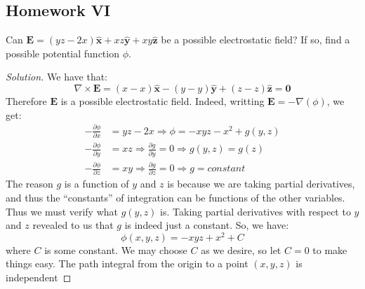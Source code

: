 \documentclass[crop=false,class=article,oneside]{standalone}
\begin{document}
    \subsection{Homework VI}
        \begin{problem}[Wangsness 5-1]
            Can
            $\mathbf{E}%
             =(yz-2x)\hat{\mathbf{x}}%
             +xz\hat{\mathbf{y}}%
             +xy\hat{\mathbf{z}}$
            be a possible electrostatic field? If so,
            find a possible potential function $\phi$.
        \end{problem}
        \begin{proof}[Solution]
            We have that:
            \begin{equation*}
                \nabla\times\mathbf{E}
                =(x-x)\hat{\mathbf{x}}
                -(y-y)\hat{\mathbf{y}}
                +(z-z)\hat{\mathbf{z}}
                =\mathbf{0}    
            \end{equation*}
            Therefore $\mathbf{E}$ is a possible electrostatic field.
            Indeed, writting $\mathbf{E}=-\nabla(\phi)$, we get:
            \begin{align*}
                -\frac{\partial\phi}{\partial{x}}
                &=yz-2x
                \Rightarrow\phi=-xyz-x^{2}+g(y,z)\\
                -\frac{\partial\phi}{\partial{y}}
                &=xz
                \Rightarrow\frac{\partial{g}}{\partial{y}}=0
                \Rightarrow{g(y,z)=g(z)}\\
                -\frac{\partial\phi}{\partial{z}}
                &=xy
                \Rightarrow\frac{\partial{g}}{\partial{z}}=0
                \Rightarrow{g=constant}
            \end{align*}
            The reason $g$ is a function of $y$ and $z$ is because
            we are taking partial derivatives, and thus the
            ``constants'' of integration can be functions of
            the other variables. Thus we must verify what $g(y,z)$
            is. Taking partial derivatives with respect to
            $y$ and $z$ revealed to us that $g$ is indeed just
            a constant. So, we have:
            \begin{equation*}
                \phi(x,y,z)=-xyz+x^{2}+C    
            \end{equation*}
            where $C$ is some constant. We may choose $C$ as we desire,
            so let $C=0$ to make things easy. The path integral
            from the origin to a point $(x,y,z)$ is independent

\end{proof}
\end{document}
